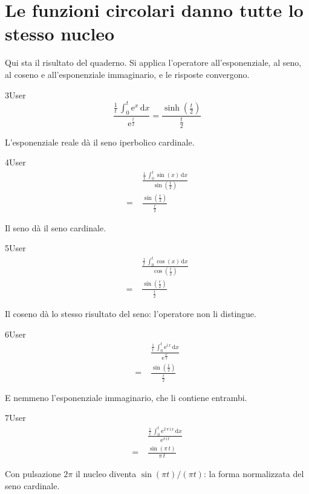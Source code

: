 \section{Le funzioni circolari danno tutte lo stesso nucleo}

Qui sta il risultato del quaderno. Si applica l'operatore all'esponenziale, al seno, al coseno e all'esponenziale immaginario, e le risposte convergono.

\begin{espr}{3}{User}{\verificata}
\[
\frac{\frac{1}{t}\, \int_{0}^{t} \mathrm{e}^{x} \,\mathrm{d}x}{\mathrm{e}^{\frac{t}{2}}} = \frac{\sinh\!\left(\frac{t}{2}\right)}{\frac{t}{2}}
\]
\end{espr}
L'esponenziale reale dà il seno iperbolico cardinale.

\begin{espr}{4}{User}{\verificata}
\begin{align*}
& \frac{\frac{1}{t}\, \int_{0}^{t} \sin\!\left(x\right) \,\mathrm{d}x}{\sin\!\left(\frac{t}{2}\right)} \\
=\;& \frac{\sin\!\left(\frac{t}{2}\right)}{\frac{t}{2}}
\end{align*}
\end{espr}
Il seno dà il seno cardinale.

\begin{espr}{5}{User}{\verificata}
\begin{align*}
& \frac{\frac{1}{t}\, \int_{0}^{t} \cos\!\left(x\right) \,\mathrm{d}x}{\cos\!\left(\frac{t}{2}\right)} \\
=\;& \frac{\sin\!\left(\frac{t}{2}\right)}{\frac{t}{2}}
\end{align*}
\end{espr}
Il coseno dà lo stesso risultato del seno: l'operatore non li distingue.

\begin{espr}{6}{User}{\verificata}
\begin{align*}
& \frac{\frac{1}{t}\, \int_{0}^{t} \mathrm{e}^{\mathrm{i}\, x} \,\mathrm{d}x}{\mathrm{e}^{\frac{\mathrm{i}\, t}{2}}} \\
=\;& \frac{\sin\!\left(\frac{t}{2}\right)}{\frac{t}{2}}
\end{align*}
\end{espr}
E nemmeno l'esponenziale immaginario, che li contiene entrambi.

\begin{espr}{7}{User}{\verificata}
\begin{align*}
& \frac{\frac{1}{t}\, \int_{0}^{t} \mathrm{e}^{2\, \pi\, \mathrm{i}\, x} \,\mathrm{d}x}{\mathrm{e}^{\pi\, \mathrm{i}\, t}} \\
=\;& \frac{\sin\!\left(\pi\, t\right)}{\pi\, t}
\end{align*}
\end{espr}
Con pulsazione $2\pi$ il nucleo diventa $\sin(\pi t)/(\pi t)$: la forma normalizzata del seno cardinale.


